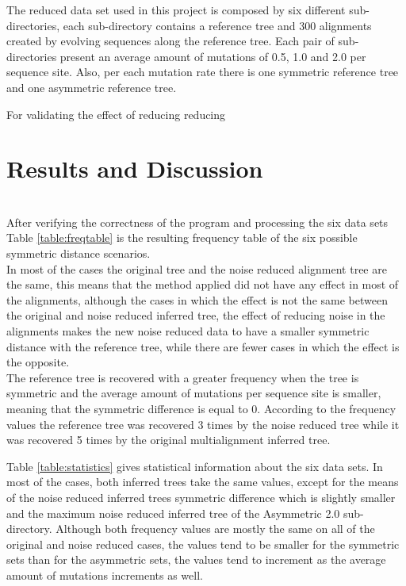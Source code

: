 \documentclass[12pt]{article}
\begin{document}
The reduced data set used in this project is composed by six different sub-directories, each sub-directory contains a reference tree and 300 alignments created by evolving sequences along the reference tree. Each pair of sub-directories present an average amount of mutations of 0.5, 1.0 and 2.0 per sequence site. Also, per each mutation rate there is one symmetric reference tree and one asymmetric reference tree.

For validating the effect of reducing reducing 

\section{Results and Discussion}\\

After verifying the correctness of the program and processing the six data sets  Table \ref{table:freqtable} is the resulting frequency table of the six possible symmetric distance scenarios.\\

In most of the cases the original tree and the noise reduced  alignment tree are the same, this means that the method applied did not have any effect in most of the alignments, although the cases in which the effect is not the same between the original and noise reduced inferred tree, the effect of reducing noise in the alignments makes the new noise reduced data to have a smaller symmetric distance with the reference tree, while there are fewer cases in which the effect is the opposite.\\

The reference tree is recovered with a greater frequency when the tree is symmetric and the average amount of mutations per sequence site is smaller, meaning that the symmetric difference is equal to 0. According to the frequency values the reference tree was recovered 3 times by the noise reduced tree  while it was recovered 5 times by the original multialignment inferred tree. 

Table \ref{table:statistics} gives statistical information about the six data sets. In most of the cases, both inferred trees take the same values, except  for the means of the noise reduced inferred trees symmetric difference which is slightly smaller and the maximum noise reduced inferred tree of the Asymmetric 2.0 sub-directory. Although both frequency values are mostly the same on all of the original and noise reduced cases, the values tend to be smaller for the symmetric sets than for the asymmetric sets, the values tend to  increment as the average amount of mutations increments as well.
\end{document}
